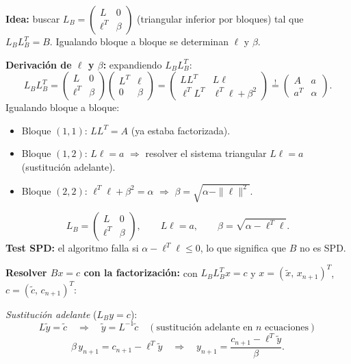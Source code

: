 \documentclass[11pt,a4paper]{article}
\begin{document}
\textbf{Idea:} buscar $L_B=\begin{pmatrix}L&0\\\ell^T&\beta\end{pmatrix}$ (triangular inferior por bloques) tal que $L_BL_B^T=B$. Igualando bloque a bloque se determinan $\ell$ y $\beta$.

\textbf{Derivación de $\ell$ y $\beta$:} expandiendo $L_BL_B^T$:
\[
  L_BL_B^T
  = \begin{pmatrix}L&0\\\ell^T&\beta\end{pmatrix}\begin{pmatrix}L^T&\ell\\0&\beta\end{pmatrix}
  = \begin{pmatrix}LL^T & L\ell \\ \ell^TL^T & \ell^T\ell+\beta^2\end{pmatrix}
  \overset{!}{=} \begin{pmatrix}A & a \\ a^T & \alpha\end{pmatrix}.
\]
Igualando bloque a bloque:
\begin{itemize}[noitemsep]
  \item Bloque $(1,1)$: $LL^T=A$ \checkmark (ya estaba factorizada).
  \item Bloque $(1,2)$: $L\ell=a$ $\Rightarrow$ resolver el sistema triangular $L\ell=a$ (sustitución adelante).
  \item Bloque $(2,2)$: $\ell^T\ell+\beta^2=\alpha$ $\Rightarrow$ $\beta=\sqrt{\alpha-\|\ell\|^2}$.
\end{itemize}

\begin{tcolorbox}[clave]
\[
  L_B = \begin{pmatrix}L & 0 \\ \ell^T & \beta\end{pmatrix},\qquad
  L\ell = a,\qquad \beta = \sqrt{\alpha - \ell^T\ell}.
\]
\textbf{Test SPD:} el algoritmo falla si $\alpha-\ell^T\ell\le0$, lo que significa que $B$ no es SPD.
\end{tcolorbox}

\textbf{Resolver $Bx=c$ con la factorización:} con $L_BL_B^Tx=c$ y $x=(\tilde x,\,x_{n+1})^T$, $c=(\tilde c,\,c_{n+1})^T$:

\textit{Sustitución adelante} ($L_By=c$):
\[
  L\tilde y=\tilde c \quad\Rightarrow\quad \tilde y=L^{-1}\tilde c \quad(\text{sustitución adelante en }n\text{ ecuaciones})
\]
\[
  \beta\,y_{n+1} = c_{n+1}-\ell^T\tilde y \quad\Rightarrow\quad y_{n+1}=\frac{c_{n+1}-\ell^T\tilde y}{\beta}.
\]
\end{document}
